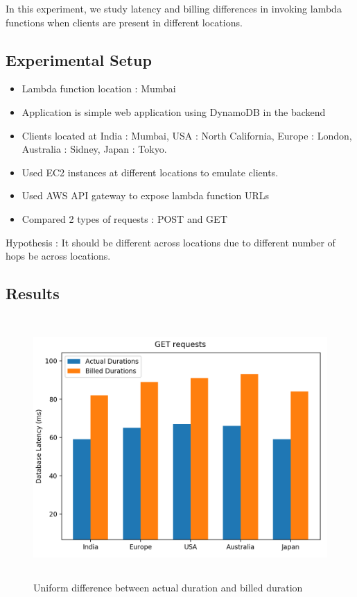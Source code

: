 In this experiment, we study latency and billing differences in invoking lambda functions when clients are present in different locations.

\subsection{Experimental Setup}
\begin{itemize}
    \item Lambda function location : Mumbai
    \item Application is simple web application using DynamoDB in the backend
    \item Clients located at India : Mumbai, USA : North California, Europe : London, Australia : Sidney, Japan : Tokyo.
    \item Used EC2 instances at different locations to emulate clients.
    \item Used AWS API gateway to expose lambda function URLs
    \item Compared 2 types of requests : POST and GET
\end{itemize}

Hypothesis : It should be different across locations due to different number of hops be across locations.

\subsection{Results}

\begin{figure}[ht]
\centering
\includegraphics[height=10cm]{Images/2get.png}
\caption{Uniform difference between actual duration and billed duration}
\end{figure}

